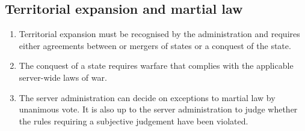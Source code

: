 \documentclass{article}
\begin{document}
\subsection{Territorial expansion and martial law}
\begin{enumerate}[(1)]
    \item Territorial expansion must be recognised by the administration and requires either agreements between or mergers of states or a conquest of the state.
    \item The conquest of a state requires warfare that complies with the applicable server-wide laws of war.
    \item The server administration can decide on exceptions to martial law by unanimous vote. It is also up to the server administration to judge whether the rules requiring a subjective judgement have been violated. %
\end{enumerate}
\end{document}
